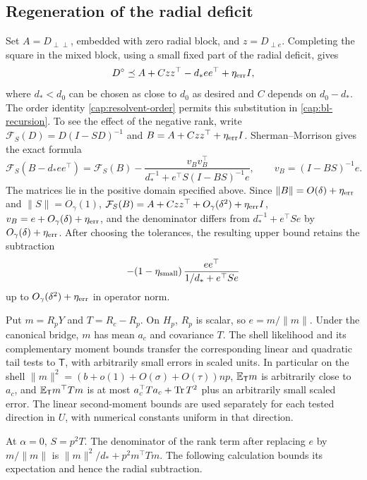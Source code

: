 \subsection{Regeneration of the radial deficit}
Set \(A=D_{\perp\perp}\), embedded with zero radial block, and
\(z=D_{\perp e}\). Completing the square in the mixed block, using a small
fixed part of the radial deficit, gives
\begin{equation}
 D^\circ\preceq A+Czz^\top-d_*ee^\top+\eta_{\rm err}I,
\end{equation}
where \(d_*<d_0\) can be chosen as close to \(d_0\) as desired and
\(C\) depends on \(d_0-d_*\). The order identity
\eqref{cap:resolvent-order} permits this substitution in
\eqref{cap:bl-recursion}. To see the effect of the negative rank, write
\(\mathcal F_S(D)=D(I-SD)^{-1}\) and
\(B=A+Czz^\top+\eta_{\rm err}I\). Sherman--Morrison gives the exact formula
\[
 \mathcal F_S(B-d_*ee^\top)
 =\mathcal F_S(B)-
   \frac{v_Bv_B^\top}
        {d_*^{-1}+e^\top S(I-BS)^{-1}e},
 \qquad v_B=(I-BS)^{-1}e.
\]
The matrices lie in the positive domain specified above.
Since \(\|B\|=O(\delta)+\eta_{\rm err}\) and \(\|S\|=O_\gamma(1)\),
\(\mathcal F_S(B)=A+Czz^\top+O_\gamma(\delta^2)+\eta_{\rm err}I\),
\(v_B=e+O_\gamma(\delta)+\eta_{\rm err}\), and the denominator differs
from \(d_*^{-1}+e^\top Se\) by \(O_\gamma(\delta)+\eta_{\rm err}\).
After choosing the tolerances, the resulting upper bound retains the
subtraction
\begin{equation}
          -(1-\eta_{\rm small})\,\frac{ee^\top}{1/d_*+e^\top S e}
\end{equation}
up to \(O_\gamma(\delta^2)+\eta_{\rm err}\) in operator norm.

Put \(m=R_pY\) and \(T=R_c-R_p\). On \(H_p\), \(R_p\) is scalar, so
\(e=m/\|m\|\). Under the canonical bridge, \(m\) has mean \(a_c\) and
covariance \(T\). The shell likelihood and its complementary moment bounds
transfer the corresponding linear and quadratic tail tests to
\(\mathsf T\), with arbitrarily small errors in scaled units. In particular
on the shell \(\|m\|^2=(b+o(1)+O(\sigma)+O(\tau))np\),
\(\mathbb E_{\mathsf T}m\) is arbitrarily
close to \(a_c\), and
\(\mathbb E_{\mathsf T}m^\top Tm\) is at most
\(a_c^\top Ta_c+\operatorname{Tr} T^2\) plus an arbitrarily small scaled error.
The linear second-moment bounds are used separately for each tested
direction in \(U\), with numerical constants uniform in that direction.

At \(\alpha=0\), \(S=p^2T\). The denominator of the rank term after replacing
\(e\) by \(m/\|m\|\) is
\(\|m\|^2/d_*+p^2m^\top Tm\). The following calculation bounds its
expectation and hence the radial subtraction.


